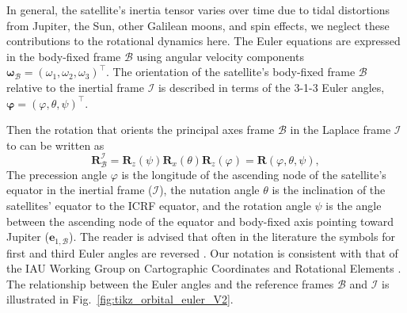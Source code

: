 \documentclass[lineno, pdflatex,sn-mathphys-ay]{sn-jnl}
\theoremstyle{thmstyleone}%
\theoremstyle{thmstyletwo}%
\theoremstyle{thmstylethree}%
\renewcommand{\vec}[1]{\boldsymbol{#1}}
\begin{document}
%
In general, the satellite's inertia tensor varies over time due to tidal distortions from Jupiter, the Sun, other Galilean moons, and spin effects, we neglect these contributions to the rotational dynamics here.
%
The Euler equations are expressed in the body-fixed frame $\mathcal{B}$ using angular velocity components ${\vec{\omega}_{\mathcal{B}} = (\omega_1, \omega_2, \omega_3)^\top}$. 
The orientation of the satellite's body-fixed frame $\mathcal{B}$ relative to the inertial frame $\mathcal{I}$
is described in terms  of the 3-1-3 Euler angles, ${\vec{\varphi} = (\varphi, \theta, \psi)^\top}$.

Then the rotation that orients the principal axes frame $\mathcal{B}$ in the Laplace frame $\mathcal{I}$ to can be written as
\begin{equation}
	\vec{R}^{\mathcal{I}}_{\mathcal{B}} =
 	\vec{R}_{z}({\psi})
	\vec{R}_{x}(\theta)
	\vec{R}_{z}(\varphi)
	= \vec{R}({\varphi},{\theta},{\psi}),
\end{equation}
The precession angle ${\varphi}$ is the longitude of the ascending node of the satellite's equator in the inertial frame ($\mathcal{I}$), the nutation angle  ${\theta}$ is the inclination of the satellites' equator to the ICRF equator, and the rotation angle ${\psi}$ is the angle between the ascending node of the equator and body-fixed axis pointing toward Jupiter ($\vec{e}_{1,\mathcal{B}}$).
%
The reader is advised that often in the literature the symbols for first and third Euler angles are reversed \citep[e.g.,][]{1980A&A....82..129B, 1981M&P....25....3E}. Our notation is consistent with that of the IAU Working Group on Cartographic Coordinates and Rotational Elements \citep{2018CeMDA.130...22A}. %
%
The relationship between the Euler angles and the reference frames $\mathcal{B}$ and $\mathcal{I}$ is illustrated in Fig.~\ref{fig:tikz_orbital_euler_V2}.
\end{document}
